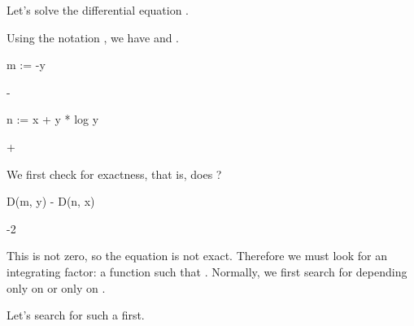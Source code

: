 {{{{{{{{{{{{{{{{Let's solve the differential equation .
%
\begin{xtc}
\begin{xtccomment}
Using the notation
,
we have  and .
\end{xtccomment}
\begin{spadsrc}
m := -y 
\end{spadsrc}
\begin{TeXOutput}
\begin{fricasmath}{1}
-{}%
\end{fricasmath}
\end{TeXOutput}
\end{xtc}
\begin{xtc}
\begin{xtccomment}
\end{xtccomment}
\begin{spadsrc}
n := x + y * log y 
\end{spadsrc}
\begin{TeXOutput}
\begin{fricasmath}{2}
\TIMES {}+%
\end{fricasmath}
\end{TeXOutput}
\end{xtc}
%
\begin{xtc}
\begin{xtccomment}
We first check for exactness, that is, does ?
\end{xtccomment}
\begin{spadsrc}
D(m, y) - D(n, x) 
\end{spadsrc}
\begin{TeXOutput}
\begin{fricasmath}{3}
-{2}%
\end{fricasmath}
\end{TeXOutput}
\end{xtc}
%
This is not zero, so the equation is not exact.
Therefore we must look for
an integrating factor: a function  such that
.
Normally, we first search for  depending only on
 or only on .
%
\begin{xtc}
\begin{xtccomment}
Let's search for such a  first.
\end{xtccomment}

\end{xtc}}}}}}}}}}}}}}}}}
